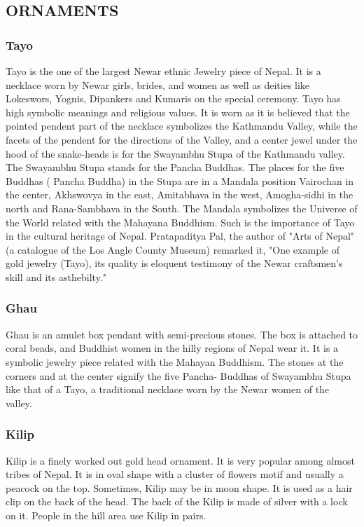 \documentclass[a4paper,13pt, margin=0.9in]{article}
\begin{document}
\begin{flushleft}
\newpage
\subsection{ORNAMENTS}
\subsubsection{Tayo}
Tayo is the one of the largest Newar ethnic Jewelry piece of Nepal. It is a necklace worn by Newar girls, brides, and women as well as deities like Lokeswors, Yognis, Dipankers and Kumaris on the special ceremony. Tayo has high symbolic meanings and religious values. It is worn as it is believed that the pointed pendent part of the necklace symbolizes the Kathmandu Valley, while the facets of the pendent for the directions of the Valley, and a center jewel under the hood of the snake-heads is for the Swayambhu Stupa of the Kathmandu valley. The Swayambhu Stupa stands for the Pancha Buddhas. The places for the five Buddhas ( Pancha Buddha) in the Stupa are in a Mandala position Vairochan in the center, Akhswovya in the east, Amitabhava in the west, Amogha-sidhi in the north and Rana-Sambhava in the South. The Mandala symbolizes the Universe of the World related with the Mahayana Buddhism. Such is the importance of Tayo in the cultural heritage of Nepal. Pratapaditya Pal, the author of "Arts of Nepal" (a catalogue of the Los Angle County Museum) remarked it, "One example of gold jewelry (Tayo), its quality is eloquent testimony of the Newar craftsmen's skill and its asthebilty."

\subsubsection{Ghau}
Ghau is an amulet box pendant with semi-precious stones. The box is attached to coral beads, and Buddhist women in the hilly regions of Nepal wear it. It is a symbolic jewelry piece related with the Mahayan Buddhism. The stones at the corners and at the center signify the five Pancha- Buddhas of Swayambhu Stupa like that of a Tayo, a traditional necklace worn by the Newar women of the valley.



\subsubsection{Kilip}
Kilip is a finely worked out gold head ornament. It is very popular among almost tribes of Nepal. It is in oval shape with a cluster of flowers motif and usually a peacock on the top. Sometimes, Kilip may be in moon shape. It is used as a hair clip on the back of the head. The back of the Kilip is made of silver with a lock on it. People in the hill area use Kilip in pairs.


\end{flushleft}
\end{document}

